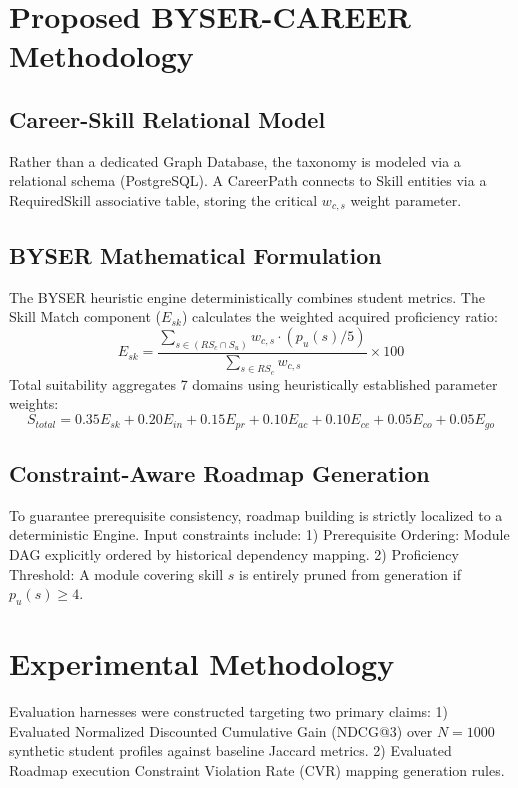 \documentclass[conference]{IEEEtran}
\begin{document}
\section{Proposed BYSER-CAREER Methodology}

\subsection{Career-Skill Relational Model}
Rather than a dedicated Graph Database, the taxonomy is modeled via a relational schema (PostgreSQL). A CareerPath connects to Skill entities via a RequiredSkill associative table, storing the critical $w_{c,s}$ weight parameter. 

\subsection{BYSER Mathematical Formulation}
The BYSER heuristic engine deterministically combines student metrics. The Skill Match component ($E_{sk}$) calculates the weighted acquired proficiency ratio:
\begin{equation}
E_{sk} = \frac{\sum_{s \in (RS_c \cap S_u)} w_{c,s} \cdot (p_u(s) / 5)}{\sum_{s \in RS_c} w_{c,s}} \times 100
\end{equation}
Total suitability aggregates 7 domains using heuristically established parameter weights:
\begin{equation}
S_{total} = 0.35 E_{sk} + 0.20 E_{in} + 0.15 E_{pr} + 0.10 E_{ac} + 0.10 E_{ce} + 0.05 E_{co} + 0.05 E_{go} 
\end{equation}

\subsection{Constraint-Aware Roadmap Generation}
To guarantee prerequisite consistency, roadmap building is strictly localized to a deterministic Engine. Input constraints include:
1) Prerequisite Ordering: Module DAG explicitly ordered by historical dependency mapping.
2) Proficiency Threshold: A module covering skill $s$ is entirely pruned from generation if $p_u(s) \ge 4$.

\section{Experimental Methodology}
Evaluation harnesses were constructed targeting two primary claims:
1) Evaluated Normalized Discounted Cumulative Gain (NDCG@3) over $N=1000$ synthetic student profiles against baseline Jaccard metrics.
2) Evaluated Roadmap execution Constraint Violation Rate (CVR) mapping generation rules.
\end{document}

